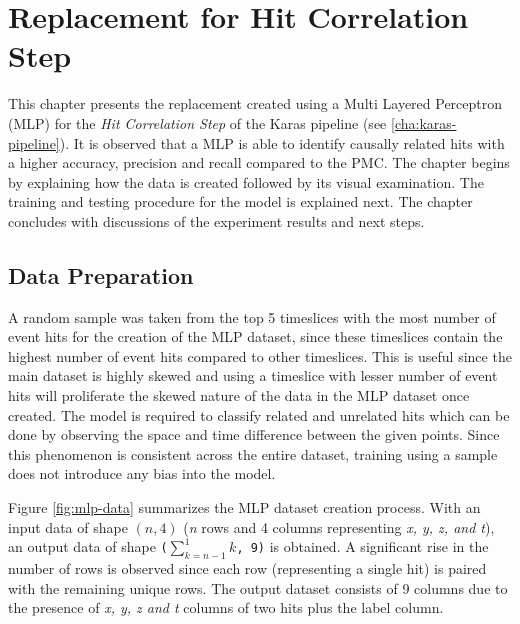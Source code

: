 
\chapter{Replacement for Hit Correlation Step} %
\label{cha:mlp}

% 
This chapter presents the replacement created using a Multi Layered
Perceptron (MLP) for the \textit{Hit Correlation Step} of the Karas
pipeline (see \ref{cha:karas-pipeline}). It is observed that a MLP is
able to identify causally related hits with a higher accuracy,
precision and recall compared to the PMC. The chapter begins by
explaining how the data is created followed by its visual examination.
The training and testing procedure for the model is explained next.
The chapter concludes with discussions of the experiment results and
next steps.

\section{Data Preparation}
\label{sec:mlp-data-prep}

A random sample was taken from the top 5 timeslices with the most
number of event hits for the creation of the MLP dataset, since these
timeslices contain the highest number of event hits compared to other
timeslices. This is useful since the main dataset is highly skewed and
using a timeslice with lesser number of event hits will proliferate
the skewed nature of the data in the MLP dataset once created. The
model is required to classify related and unrelated hits which can be
done by observing the space and time difference between the given
points. Since this phenomenon is consistent across the entire dataset,
training using a sample does not introduce any bias into the model.

Figure \ref{fig:mlp-data} summarizes the MLP dataset creation
process. With an input data of shape $(n, 4)$ (\emph{n} rows
and 4 columns representing \emph{x, y, z, and t}), an output
data of shape \texttt{($\sum_{k=n-1}^{1}k$, 9)} is obtained. A
significant rise in the number of rows is observed since each row
(representing a single hit) is paired with the remaining unique rows.
The output dataset consists of 9 columns due to the presence of
\emph{x, y, z and t} columns of two hits plus the label column.

